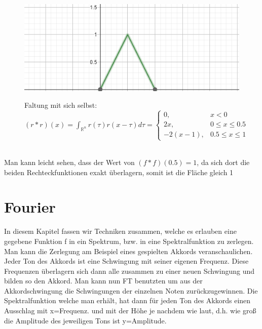 \documentclass[12pt,a4paper]{article}
\newcommand{\nl}{\\[0.1cm]}
\begin{document}
\begin{minipage}{\linewidth}
\centering
\begin{minipage}{0.45\linewidth}
\begin{figure}[H]
\includegraphics[width=\linewidth]{./resources/rechteck_faltung.png}
\end{figure}
\end{minipage}
\hspace{0.05\linewidth}
\begin{minipage}{0.45\linewidth}
\begin{figure}[H]
Faltung mit sich selbst: $(r\ast r)(x) = \displaystyle \int_{\mathbb{R}^n} r(\tau)r(x-\tau)d\tau = \begin{cases} 0,& x<0 \\ 2x, & 0 \leq x \leq 0.5 \\ -2(x-1), & 0.5 \leq x \leq 1 \end{cases}$
\end{figure}
\end{minipage}
\end{minipage}
\nl
Man kann leicht sehen, dass der Wert von $(f \ast f) (0.5) = 1$, da sich dort die beiden Rechteckfunktionen exakt überlagern, somit ist die Fläche gleich 1


\section{Fourier}
In diesem Kapitel fassen wir Techniken zusammen, welche es erlauben eine gegebene Funktion f in ein Spektrum, bzw. in eine Spektralfunktion zu zerlegen. Man kann die Zerlegung am Beispiel eines gespielten Akkords veranschaulichen. Jeder Ton des Akkords ist eine Schwingung mit seiner eigenen Frequenz. Diese Frequenzen überlagern sich dann alle zusammen zu einer neuen Schwingung und bilden so den Akkord. Man kann nun FT benutzten um aus der Akkordschwingung die Schwingungen der einzelnen Noten zurückzugewinnen. Die Spektralfunktion welche man erhält, hat dann für jeden Ton des Akkords einen Ausschlag mit x=Frequenz. und mit der Höhe je nachdem wie laut, d.h. wie groß die Amplitude des jeweiligen Tons ist y=Amplitude.\nl
\end{document}
